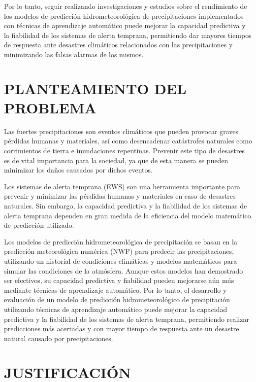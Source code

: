 \documentclass[stu, 12pt, helv, letterpaper, donotrepeattitle, floatsintext, natbib]{apa7}
\begin{document}
Por lo tanto, seguir realizando investigaciones y estudios sobre el rendimiento de los modelos de predicción hidrometeorológica de precipitaciones implementados con técnicas de aprendizaje automático puede mejorar la capacidad predictiva y la fiabilidad de los sistemas de alerta temprana, permitiendo dar mayores tiempos de respuesta ante desastres climáticos relacionados con las precipitaciones y minimizando las falsas alarmas de los mismos.

\newpage

\section*{PLANTEAMIENTO DEL PROBLEMA}

Las fuertes precipitaciones son eventos climáticos que pueden provocar graves pérdidas humanas y materiales, así como desencadenar catástrofes naturales como corrimientos de tierra e inundaciones repentinas. Prevenir este tipo de desastres es de vital importancia para la sociedad, ya que de esta manera se pueden minimizar los daños causados por dichos eventos.

Los sistemas de alerta temprana (EWS) son una herramienta importante para prevenir y minimizar las pérdidas humanas y materiales en caso de desastres naturales. Sin embargo, la capacidad predictiva y la fiabilidad de los sistemas de alerta temprana dependen en gran medida de la eficiencia del modelo matemático de predicción utilizado.

Los modelos de predicción hidrometeorológica de precipitación se basan en la predicción meteorológica numérica (NWP) para predecir las precipitaciones, utilizando un historial de condiciones climáticas y modelos matemáticos para simular las condiciones de la atmósfera. Aunque estos modelos han demostrado ser efectivos, su capacidad predictiva y fiabilidad pueden mejorarse aún más mediante técnicas de aprendizaje automático. Por lo tanto, el desarrollo y evaluación de un modelo de predicción hidrometeorológico de precipitación utilizando técnicas de aprendizaje automático puede mejorar la capacidad predictiva y la fiabilidad de los sistemas de alerta temprana, permitiendo realizar predicciones más acertadas y con mayor tiempo de respuesta ante un desastre natural causado por precipitaciones.

\section*{JUSTIFICACIÓN}
\end{document}
